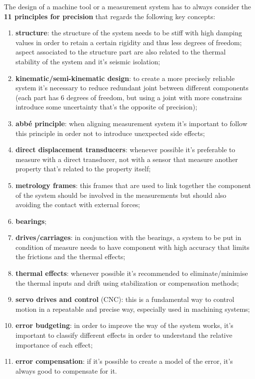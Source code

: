 	The design of a machine tool or a measurement system has to always consider the \textbf{11 principles for precision} that regards the following key concepts:
	\begin{enumerate}
		\item \textbf{structure}: the structure of the system needs to be stiff with high damping values in order to retain a certain rigidity and thus less degrees of freedom; aspect associated to the structure part are also related to the thermal stability of the system and it's seismic isolation;
		
		\item \textbf{kinematic/semi-kinematic design}: to create a more precisely reliable system  it's necessary to reduce redundant joint between different components (each part has 6 degrees of freedom, but using a joint with more constrains introduce some uncertainty that's the opposite of precision);
		
		\item \textbf{abbé principle}: when aligning measurement system it's important to follow this principle in order not to introduce unexpected side effects;
		
		\item \textbf{direct displacement transducers}: whenever possible it's preferable to measure with a direct transducer, not with a sensor that measure another property that's related to the property itself;
		
		\item \textbf{metrology frames}: this frames that are used to link together the component of the system should be involved in the measurements but should also avoiding the contact with external forces;
		
		\item \textbf{bearings};
		
		\item \textbf{drives/carriages}: in conjunction with the bearings, a system to be put in condition of measure needs to have component with high accuracy that limits the frictions and the thermal effects;
		
		\item \textbf{thermal effects}: whenever possible it's recommended to eliminate/minimise the thermal inputs and drift using stabilization or compensation methods;
		
		\item \textbf{servo drives and control} (CNC): this is a fundamental way to control motion in a repeatable and precise way, especially used in machining systems;
		
		\item \textbf{error budgeting}: in order to improve the way of the system works, it's important to classify different effects in order to understand the relative importance of each effect;
		
		\item \textbf{error compensation}: if it's possible to create a model of the error, it's always good to compensate for it.		
		
	\end{enumerate}
	
